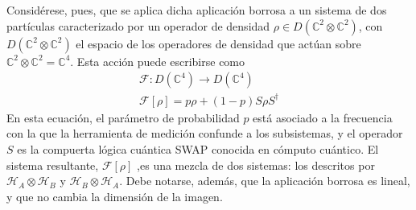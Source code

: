 \documentclass[onecolumn,11pt]{article}
\newcommand{\mcH}{\mathcal{H}}
\newcommand{\mcF}{\mathcal{F}}
\newcommand{\Complex}{\mathbb{C}} %
\newcommand{\Fuzzy}[1]{\mcF\left[#1\right]}
\begin{document}
Considérese, pues, que se aplica dicha aplicación borrosa a un sistema de dos partículas caracterizado por un operador de densidad $\rho\in D(\Complex^{2}\otimes\Complex^{2})$, con $D(\Complex^{2}\otimes\Complex^{2})$ el espacio de los operadores de densidad que actúan sobre $\Complex^{2}\otimes\Complex^{2}=\Complex^{4}$. Esta acción puede escribirse como
\begin{gather}
\mcF:D(\Complex^{4})\rightarrow D(\Complex^{4})\label{eq:Fuzzy2Domain}\\
\Fuzzy{\rho}=p\rho+(1-p)S\rho S^{\dag}\label{eq:Fuzzy2}
\end{gather}
En esta ecuación, el parámetro  de probabilidad $p$ está asociado a la frecuencia con la que la herramienta de medición confunde a los subsistemas, y el operador $S$ es la compuerta lógica cuántica SWAP conocida en cómputo cuántico. El sistema resultante, $\Fuzzy{\rho}$ ,es una mezcla de dos sistemas: los descritos por $\mcH_{A}\otimes\mcH_{B}$ y $\mcH_{B}\otimes\mcH_{A}$. Debe notarse, además, que la aplicación borrosa es lineal, y que no cambia la dimensión de la imagen.
\end{document}
